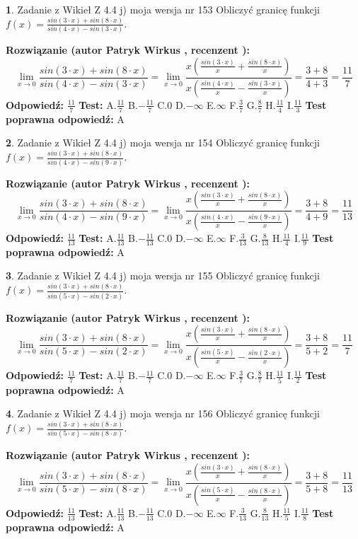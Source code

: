 \documentclass[12pt, a4paper]{article}
\theoremstyle{definition} %
\newtheorem{zad}{}
\newcommand{\zadStart}[1]{\begin{zad}#1\newline}
\newcommand{\zadStop}{\end{zad}}
\newcommand{\rozwStart}[2]{\noindent \textbf{Rozwiązanie (autor #1 , recenzent #2): }\newline}
\newcommand{\rozwStop}{\newline}
\newcommand{\odpStart}{\noindent \textbf{Odpowiedź:}\newline}
\newcommand{\odpStop}{\newline}
\newcommand{\testStart}{\noindent \textbf{Test:}\newline}
\newcommand{\testStop}{\newline}
\newcommand{\kluczStart}{\noindent \textbf{Test poprawna odpowiedź:}\newline}
\newcommand{\kluczStop}{\newline}
\begin{document}
\zadStart{Zadanie z Wikieł Z 4.4 j) moja wersja nr 153}
Obliczyć granicę funkcji $f(x)=\frac{sin(3\cdot x) +sin(8\cdot x)}{sin(4\cdot x) -sin(3\cdot x)}$.
\zadStop
\rozwStart{Patryk Wirkus}{}
$$\lim\limits_{x\to 0}\frac{sin(3\cdot x) +sin(8\cdot x)}{sin(4\cdot x) -sin(3\cdot x)}=\lim\limits_{x\to 0}\frac{x(\frac{sin(3\cdot x)}{x}+\frac{sin(8\cdot x)}{x})}{x(\frac{sin(4\cdot x)}{x}-\frac{sin(3\cdot x)}{x})}=\frac{3+8}{4+3} = \frac{11}{7}$$
\rozwStop
\odpStart
$\frac{11}{7}$
\odpStop
\testStart
A.$\frac{11}{7}$
B.$-\frac{11}{7}$
C.$0$
D.$-\infty$
E.$\infty$
F.$\frac{3}{7}$
G.$\frac{8}{7}$
H.$\frac{11}{4}$
I.$\frac{11}{3}$
\testStop
\kluczStart
A
\kluczStop



\zadStart{Zadanie z Wikieł Z 4.4 j) moja wersja nr 154}
Obliczyć granicę funkcji $f(x)=\frac{sin(3\cdot x) +sin(8\cdot x)}{sin(4\cdot x) -sin(9\cdot x)}$.
\zadStop
\rozwStart{Patryk Wirkus}{}
$$\lim\limits_{x\to 0}\frac{sin(3\cdot x) +sin(8\cdot x)}{sin(4\cdot x) -sin(9\cdot x)}=\lim\limits_{x\to 0}\frac{x(\frac{sin(3\cdot x)}{x}+\frac{sin(8\cdot x)}{x})}{x(\frac{sin(4\cdot x)}{x}-\frac{sin(9\cdot x)}{x})}=\frac{3+8}{4+9} = \frac{11}{13}$$
\rozwStop
\odpStart
$\frac{11}{13}$
\odpStop
\testStart
A.$\frac{11}{13}$
B.$-\frac{11}{13}$
C.$0$
D.$-\infty$
E.$\infty$
F.$\frac{3}{13}$
G.$\frac{8}{13}$
H.$\frac{11}{4}$
I.$\frac{11}{9}$
\testStop
\kluczStart
A
\kluczStop



\zadStart{Zadanie z Wikieł Z 4.4 j) moja wersja nr 155}
Obliczyć granicę funkcji $f(x)=\frac{sin(3\cdot x) +sin(8\cdot x)}{sin(5\cdot x) -sin(2\cdot x)}$.
\zadStop
\rozwStart{Patryk Wirkus}{}
$$\lim\limits_{x\to 0}\frac{sin(3\cdot x) +sin(8\cdot x)}{sin(5\cdot x) -sin(2\cdot x)}=\lim\limits_{x\to 0}\frac{x(\frac{sin(3\cdot x)}{x}+\frac{sin(8\cdot x)}{x})}{x(\frac{sin(5\cdot x)}{x}-\frac{sin(2\cdot x)}{x})}=\frac{3+8}{5+2} = \frac{11}{7}$$
\rozwStop
\odpStart
$\frac{11}{7}$
\odpStop
\testStart
A.$\frac{11}{7}$
B.$-\frac{11}{7}$
C.$0$
D.$-\infty$
E.$\infty$
F.$\frac{3}{7}$
G.$\frac{8}{7}$
H.$\frac{11}{5}$
I.$\frac{11}{2}$
\testStop
\kluczStart
A
\kluczStop



\zadStart{Zadanie z Wikieł Z 4.4 j) moja wersja nr 156}
Obliczyć granicę funkcji $f(x)=\frac{sin(3\cdot x) +sin(8\cdot x)}{sin(5\cdot x) -sin(8\cdot x)}$.
\zadStop
\rozwStart{Patryk Wirkus}{}
$$\lim\limits_{x\to 0}\frac{sin(3\cdot x) +sin(8\cdot x)}{sin(5\cdot x) -sin(8\cdot x)}=\lim\limits_{x\to 0}\frac{x(\frac{sin(3\cdot x)}{x}+\frac{sin(8\cdot x)}{x})}{x(\frac{sin(5\cdot x)}{x}-\frac{sin(8\cdot x)}{x})}=\frac{3+8}{5+8} = \frac{11}{13}$$
\rozwStop
\odpStart
$\frac{11}{13}$
\odpStop
\testStart
A.$\frac{11}{13}$
B.$-\frac{11}{13}$
C.$0$
D.$-\infty$
E.$\infty$
F.$\frac{3}{13}$
G.$\frac{8}{13}$
H.$\frac{11}{5}$
I.$\frac{11}{8}$
\testStop
\kluczStart
A
\kluczStop
\end{document}
